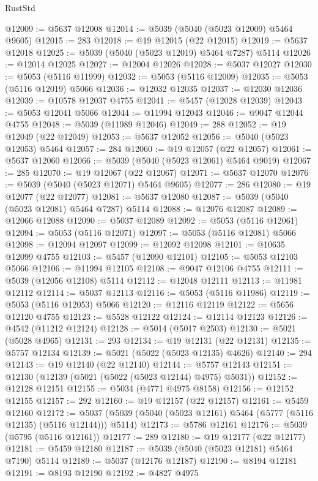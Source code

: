 \begin{lexlean}{RustStd}
\begin{coremodule}
@12009 := @5637 @12008
@12014 := @5039 (@5040 (@5023 @12009) @5464 @9605)
@12015 := 283
@12018 := @19 @12015 (@22 @12015)
@12019 := @5637 @12018
@12025 := @5039 (@5040 (@5023 @12019) @5464 @7287) @5114
@12026 := @12014 @12025
@12027 := @12004 @12026
@12028 := @5037 @12027
@12030 := @5053 (@5116 @11999)
@12032 := @5053 (@5116 @12009)
@12035 := @5053 (@5116 @12019) @5066
@12036 := @12032 @12035
@12037 := @12030 @12036
@12039 := @10578 @12037 @4755
@12041 := @5457 (@12028 @12039)
@12043 := @5053 @12041 @5066
@12044 := @11994 @12043
@12046 := @9047 @12044 @4755
@12048 := @5039 (@11989 @12046)
@12049 := 288
@12052 := @19 @12049 (@22 @12049)
@12053 := @5637 @12052
@12056 := @5040 (@5023 @12053) @5464
@12057 := 284
@12060 := @19 @12057 (@22 @12057)
@12061 := @5637 @12060
@12066 := @5039 (@5040 (@5023 @12061) @5464 @9019)
@12067 := 285
@12070 := @19 @12067 (@22 @12067)
@12071 := @5637 @12070
@12076 := @5039 (@5040 (@5023 @12071) @5464 @9605)
@12077 := 286
@12080 := @19 @12077 (@22 @12077)
@12081 := @5637 @12080
@12087 := @5039 (@5040 (@5023 @12081) @5464 @7287) @5114
@12088 := @12076 @12087
@12089 := @12066 @12088
@12090 := @5037 @12089
@12092 := @5053 (@5116 @12061)
@12094 := @5053 (@5116 @12071)
@12097 := @5053 (@5116 @12081) @5066
@12098 := @12094 @12097
@12099 := @12092 @12098
@12101 := @10635 @12099 @4755
@12103 := @5457 (@12090 @12101)
@12105 := @5053 @12103 @5066
@12106 := @11994 @12105
@12108 := @9047 @12106 @4755
@12111 := @5039 (@12056 @12108) @5114
@12112 := @12048 @12111
@12113 := @11981 @12112
@12114 := @5037 @12113
@12116 := @5053 (@5116 @11986)
@12119 := @5053 (@5116 @12053) @5066
@12120 := @12116 @12119
@12122 := @5656 @12120 @4755
@12123 := @5528 @12122
@12124 := @12114 @12123
@12126 := @4542 (@11212 @12124)
@12128 := @5014 (@5017 @2503)
@12130 := @5021 (@5028 @4965)
@12131 := 293
@12134 := @19 @12131 (@22 @12131)
@12135 := @5757 @12134
@12139 := @5021 (@5022 (@5023 @12135) @4626)
@12140 := 294
@12143 := @19 @12140 (@22 @12140)
@12144 := @5757 @12143
@12151 := @12130 (@12139 (@5021 (@5022 (@5023 @12144) @4975) @5031))
@12152 := @12128 @12151
@12155 := @5034 (@4771 @4975 @8158)
@12156 := @12152 @12155
@12157 := 292
@12160 := @19 @12157 (@22 @12157)
@12161 := @5459 @12160
@12172 := @5037 (@5039 (@5040 (@5023 @12161) @5464 (@5777 (@5116 @12135) (@5116 @12144))) @5114)
@12173 := @5786 @12161
@12176 := @5039 (@5795 (@5116 @12161))
@12177 := 289
@12180 := @19 @12177 (@22 @12177)
@12181 := @5459 @12180
@12187 := @5039 (@5040 (@5023 @12181) @5464 @7190) @5114
@12189 := @5037 (@12176 @12187)
@12190 := @8194 @12181
@12191 := @8193 @12190
@12192 := @4827 @4975

\end{coremodule}
\end{lexlean}
